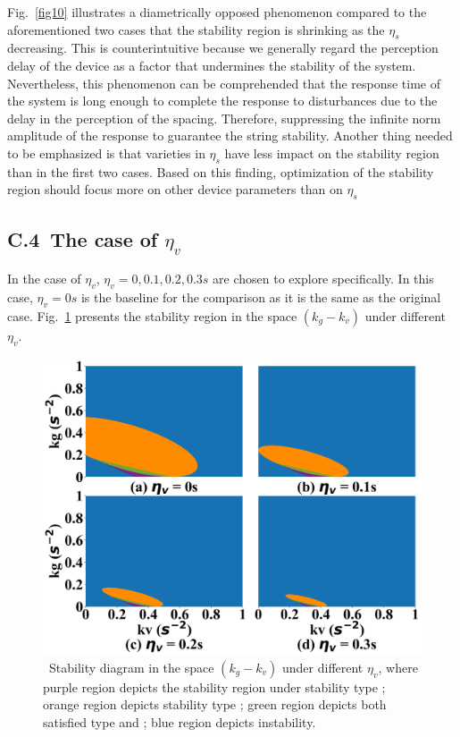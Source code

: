 \documentclass[a4paper]{cas-sc}
\begin{document}
Fig.~\ref{fig10} illustrates a diametrically opposed phenomenon compared to the aforementioned two cases that the stability region is shrinking as the $\eta_s$ decreasing. This is counterintuitive because we generally regard the perception delay of the device as a factor that undermines the stability of the system. Nevertheless, this phenomenon can be comprehended that the response time of the system is long enough to complete the response to disturbances due to the delay in the perception of the spacing. Therefore, suppressing the infinite norm amplitude of the response to guarantee the string stability. Another thing needed to be emphasized is that varieties in $\eta_s$ have less impact on the stability region than in the first two cases. Based on this finding, optimization of the stability region should focus more on other device parameters than on $\eta_s$


\subsection*{C.4~The case of $\eta_v$}

In the case of $\eta_v$, $\eta_v=0,0.1,0.2,0.3s$ are chosen to explore specifically. In this case, $\eta_v=0s$ is the baseline for the comparison as it is the same as the original case. Fig.~\ref{fig11} presents the stability region in the space $(k_g-k_v)$ under different $\eta_v$.

\begin{figure}
  \centering
  \includegraphics[width=14cm]{figs/fig11.png}
  \caption{~Stability diagram in the space $(k_g-k_v)$ under different $\eta_v$, where purple region depicts the stability region under stability type \uppercase\expandafter{}; orange region depicts stability type \uppercase\expandafter{}; green region depicts both satisfied type \uppercase\expandafter{} and \uppercase\expandafter{}; blue region depicts instability.}
  \label{fig11}
\end{figure}
\end{document}
